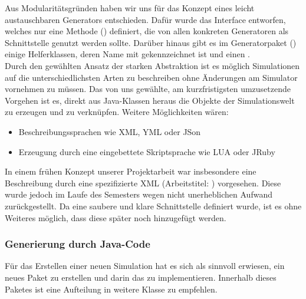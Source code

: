 Aus Modularitätsgründen haben wir uns für das Konzept eines leicht austauschbaren Generators entschieden. Dafür wurde das Interface  entworfen, welches nur eine Methode () definiert, die von allen konkreten Generatoren als Schnittstelle genutzt werden sollte.
Darüber hinaus gibt es im Generatorpaket () einige Helferklassen, deren Name mit  gekennzeichnet ist und einen .\\

Durch den gewählten Ansatz der starken Abstraktion ist es möglich Simulationen auf die unterschiedlichsten Arten zu beschreiben ohne Änderungen am Simulator vornehmen zu müssen. Das von uns gewählte, am kurzfristigsten umzusetzende Vorgehen ist es, direkt aus Java-Klassen heraus die Objekte der Simulationswelt zu erzeugen und zu verknüpfen. Weitere Möglichkeiten wären:
\begin{itemize}
  \item{Beschreibungssprachen wie XML, YML oder JSon}
  \item{Erzeugung durch eine eingebettete Skriptsprache wie LUA oder JRuby}
\end{itemize}
In einem frühen Konzept unserer Projektarbeit war insbesondere eine Beschreibung durch eine spezifizierte XML (Arbeitstitel: ) vorgesehen. Diese wurde jedoch im Laufe des Semesters wegen nicht unerheblichen Aufwand zurückgestellt. Da eine saubere und klare Schnittstelle definiert wurde, ist es ohne Weiteres möglich, dass diese später noch hinzugefügt werden.

\subsubsection{Generierung durch Java-Code}\label{subsec:real_generator_java}
Für das Erstellen einer neuen Simulation hat es sich als sinnvoll erwiesen, ein neues Paket zu erstellen und darin das  zu implementieren. Innerhalb dieses Paketes ist eine Aufteilung in weitere Klasse zu empfehlen.

